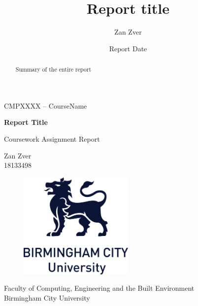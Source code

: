 \documentclass[12pt]{article}
\title{Report title}
\author{Zan Zver}
\date{Report Date }
\newcommand{\authorName}{Zan Zver}
\newcommand{\authorID}{18133498}
\newcommand{\reportTitle}{Report Title}
\begin{document}
%
\begin{titlepage}
    \begin{center}
        CMPXXXX – CourseName
        \vspace*{0.5cm}
 
        \huge\textbf{\reportTitle} 
 
        \vspace{0.5cm}
         Coursework Assignment Report
             
        \vspace{1.5cm}
 
        \authorName \\
        \authorID
 
 
        \vfill
             
        \vspace{0.8cm}
      
        \begin{figure}[htp]
         \centering
         \includegraphics[width=0.5\textwidth]{logo}
        \end{figure}
             
        \large{Faculty of Computing, Engineering and the Built Environment \\
        Birmingham City University \\}
             
    \end{center}
\end{titlepage}

\pagestyle{fancy}
\fancyhf{}
\setlength{\headsep}{50pt}

\tableofcontents

\listoftables

\listoffigures

\newpage

\begin{abstract}
    Summary of the entire report
\end{abstract}


\end{document}
